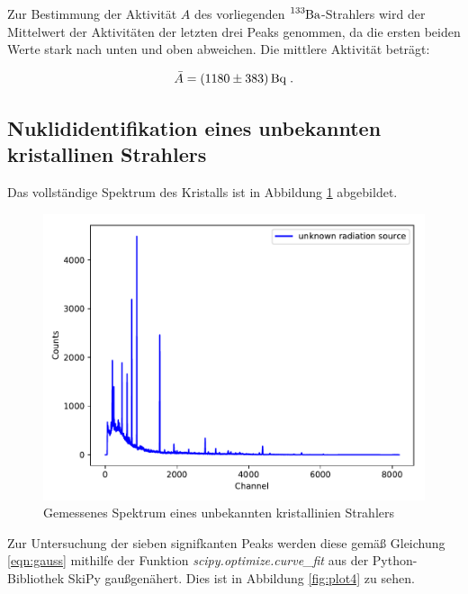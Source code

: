 Zur Bestimmung der Aktivität $A$ des vorliegenden $\ce{^{133}Ba}$-Strahlers wird der Mittelwert der Aktivitäten der letzten drei
Peaks genommen, da die ersten beiden Werte stark nach unten und oben abweichen.
Die mittlere Aktivität beträgt:

\begin{equation*}
  \bar{A} = \SI{1180 +- 383}{\becquerel} \; .
\end{equation*}


\subsection{Nuklididentifikation %
            eines unbekannten kristallinen Strahlers}

Das vollständige Spektrum des Kristalls ist in Abbildung \ref{fig:plot41} abgebildet.

\begin{figure}
  \centering
  \includegraphics[scale=0.7]{content/plot41.pdf}
  \caption{Gemessenes Spektrum eines unbekannten kristallinien Strahlers}
  \label{fig:plot41}
\end{figure}

Zur Untersuchung der sieben signifkanten Peaks werden diese gemäß Gleichung \eqref{eqn:gauss} 
mithilfe der Funktion \textit{scipy.optimize.curve\_fit} aus der Python-Bibliothek SkiPy gaußgenähert.
Dies ist in Abbildung \ref{fig:plot4} zu sehen.


